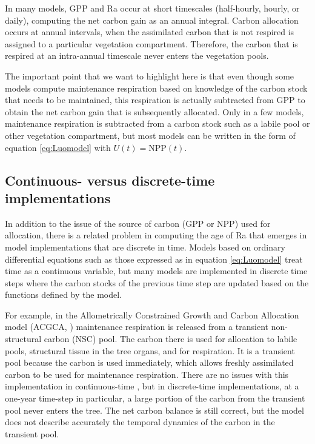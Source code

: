\documentclass[bg, manuscript]{copernicus}
\begin{document}
In many models, GPP and Ra occur at short timescales (half-hourly, hourly, or daily), computing the net carbon gain as an annual integral. Carbon allocation occurs at annual intervals, when the assimilated carbon that is not respired is assigned to a particular vegetation compartment. Therefore, the carbon that is respired at an intra-annual timescale never enters the vegetation pools.

The important point that we want to highlight here is that even though some models compute maintenance respiration based on knowledge of the carbon stock that needs to be maintained, this respiration is actually subtracted from GPP to obtain the net carbon gain that is subsequently allocated. Only in a few models, maintenance respiration is subtracted from a carbon stock such as a labile pool or other vegetation compartment, but most models can be written in the form of equation \eqref{eq:Luomodel} with $U(t) = \mathrm{NPP}(t)$. 

\subsection{Continuous- versus discrete-time implementations}
In addition to the issue of the source of carbon (GPP or NPP) used for allocation, there is a related problem in computing the age of Ra that emerges in model implementations that are discrete in time. 
Models based on ordinary differential equations such as those expressed as in equation \eqref{eq:Luomodel} treat time as a continuous variable, but many models are implemented in discrete time steps where the carbon stocks of the previous time step are updated based on the functions defined by the model. %

For example, in the Allometrically Constrained Growth and Carbon Allocation model (ACGCA, \citet{Ogle2009}) maintenance respiration is released from a transient non-structural carbon (NSC) pool.
The carbon there is used for allocation to labile pools, structural tissue in the tree organs, and for respiration.
It is a transient pool because the carbon is used immediately, which allows freshly assimilated carbon to be used  for maintenance respiration.
There are no issues with this implementation in continuous-time \citep{Herrera2020}, but in discrete-time implementations, at a one-year time-step in particular, a large portion of the carbon from the transient pool
never enters the tree.
The net carbon balance is still correct, but the model does not describe accurately the temporal dynamics of the carbon in the transient pool.
\end{document}

